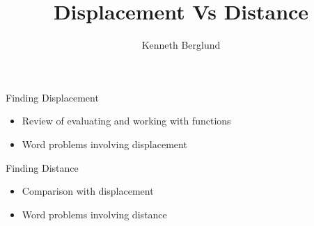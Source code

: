 \documentclass{ximera}
\author{Kenneth Berglund}
\title{Displacement Vs Distance}
\begin{document}
\begin{abstract}
\end{abstract}
\maketitle


\begin{objectives}
\item Finding Displacement
\begin{itemize}
	\item Review of evaluating and working with functions
	\item Word problems involving displacement
\end{itemize}

\item Finding Distance
\begin{itemize}
	\item Comparison with displacement
	\item Word problems involving distance
\end{itemize}


\end{objectives}
\end{document}
